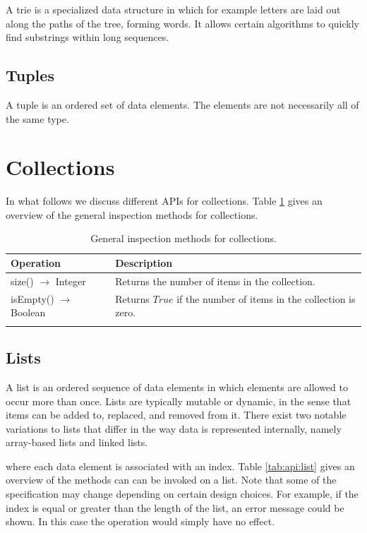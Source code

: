A trie is a specialized data structure in which for example letters are laid out along the paths of the tree, forming words. It allows certain algorithms to quickly find substrings within long sequences.


\subsection{Tuples}

A tuple is an ordered set of data elements. The elements are not necessarily all of the same type.



\section{Collections}

In what follows we discuss different APIs for collections. Table \ref{tab:api:collections} gives an overview of the general inspection methods for collections.

\begin{table}[H]
	\caption{General inspection methods for collections.}
	\label{tab:api:collections}
	\begin{tabular}{p{150px} | p{250px}}
		\textbf{Operation} & \textbf{Description} \\
		\hline
		size() $\rightarrow$ Integer & Returns the number of items in the collection. \\
		isEmpty() $\rightarrow$ Boolean & Returns $True$ if the number of items in the collection is zero. \\
		& \\
		\hline
	\end{tabular}
\end{table}



\subsection{Lists}

A list is an ordered sequence of data elements in which elements are allowed to occur more than once. Lists are typically mutable or dynamic, in the sense that items can be added to, replaced, and removed from it. There exist two notable variations to lists that differ in the way data is represented internally, namely array-based lists and linked lists.

where each data element is associated with an index. Table \ref{tab:api:list} gives an overview of the methods can can be invoked on a list. Note that some of the specification may change depending on certain design choices. For example, if the index is equal or greater than the length of the list, an error message could be shown. In this case the operation would simply have no effect.

